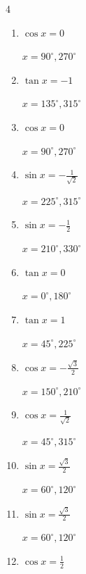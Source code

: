 \begin{multicols}{4}
\begin{enumerate}
  \item $\displaystyle \cos{x}  = 0$

        $\displaystyle x = 90^{\circ} , 270^{\circ}$

  \item $\displaystyle \tan{x}  = -1$

        $\displaystyle x = 135^{\circ} , 315^{\circ}$

  \item $\displaystyle \cos{x}  = 0$

        $\displaystyle x = 90^{\circ} , 270^{\circ}$

  \item $\displaystyle \sin{x}  = -\frac{1}{\sqrt{2}}$

        $\displaystyle x = 225^{\circ} , 315^{\circ}$

  \item $\displaystyle \sin{x}  = -\frac{1}{2}$

        $\displaystyle x = 210^{\circ} , 330^{\circ}$

  \item $\displaystyle \tan{x}  = 0$

        $\displaystyle x = 0^{\circ} , 180^{\circ}$

  \item $\displaystyle \tan{x}  = 1$

        $\displaystyle x = 45^{\circ} , 225^{\circ}$

  \item $\displaystyle \cos{x}  = -\frac{\sqrt{3}}{2}$

        $\displaystyle x = 150^{\circ} , 210^{\circ}$

  \item $\displaystyle \cos{x}  = \frac{1}{\sqrt{2}}$

        $\displaystyle x = 45^{\circ} , 315^{\circ}$

  \item $\displaystyle \sin{x}  = \frac{\sqrt{3}}{2}$

        $\displaystyle x = 60^{\circ} , 120^{\circ}$

  \item $\displaystyle \sin{x}  = \frac{\sqrt{3}}{2}$

        $\displaystyle x = 60^{\circ} , 120^{\circ}$

\columnbreak %

  \item $\displaystyle \cos{x}  = \frac{1}{2}$


\end{enumerate}
\end{multicols}

